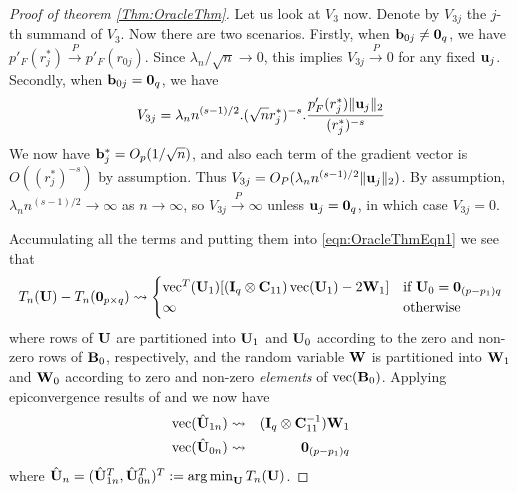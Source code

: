 \begin{proof}[Proof of theorem \ref{Thm:OracleThm}]
Let us look at $V_3$ now. Denote by $V_{3j}$ the $j$-th summand of $V_3$. Now there are two scenarios. Firstly, when ${\bf{b}}_{0j} \neq {\bf 0}_q$, we have $p'_F ( r_j^*) \stackrel{P}{\rightarrow} p'_F ( r_{0j})$. Since $\lambda_n / \sqrt n \rightarrow 0$, this implies $V_{3j} \stackrel{P}{\rightarrow} 0$ for any fixed ${\bf{u}}_j$. Secondly, when ${\bf{b}}_{0j} = {\bf 0}_q$, we have
%
$$
V_{3j} = \lambda_n n^{(s-1)/2}. (\sqrt n r^*_j )^{-s}.\frac{ p'_F ( r_j^*) \| {\bf{u}}_j \|_2 }{ (r^*_j) ^{-s}}
$$
%
We now have ${\bf{b}}^*_j = O_p(1/\sqrt n)$, and also each term of the gradient vector is $O ((r^*_j)^{-s})$ by assumption. Thus $V_{3j} = O_P( \lambda_n n^{(s-1)/2} \| {\bf{u}}_j \|_2)$. By assumption, $\lambda_n n^{(s-1)/2} \rightarrow \infty$ as $n \rightarrow \infty$, so $V_{3j} \stackrel{P}{\rightarrow} \infty$ unless ${\bf{u}}_j = {\bf 0}_q$, in which case $V_{3j} = 0$.

Accumulating all the terms and putting them into \ref{eqn:OracleThmEqn1} we see that
%
\begin{equation}
T_n({\mathbf{U}}) - T_n({\bf 0}_{p \times q}) \leadsto
\begin{cases}
\operatorname*{\text{vec}}^T ({\mathbf{U}}_1) [ ({\mathbf{I}}_q \otimes {\mathbf{C}}_{11}) \operatorname*{\text{vec}}({\mathbf{U}}_1) - 2 {\mathbf{W}}_1 ] & \text{if } {\mathbf{U}}_0 = {\bf 0}_{(p-p_1)q}\\
\infty & \text{otherwise}
\end{cases}
\end{equation}
where rows of ${\mathbf{U}}$ are partitioned into ${\mathbf{U}}_1$ and ${\mathbf{U}}_0$ according to the zero and non-zero rows of ${\mathbf{B}}_0$, respectively, and the random variable ${\mathbf{W}}$ is partitioned into ${\mathbf{W}}_1$ and ${\mathbf{W}}_0$ according to zero and non-zero \textit{elements} of $\operatorname*{\text{vec}} ({\mathbf{B}}_0)$. Applying epiconvergence results of \cite{Geyer94} and \cite{KnightFu00} we now have
%
\begin{eqnarray}
\operatorname*{\text{vec}}(\hat{{\mathbf{U}}}_{1n}) &\leadsto & ({\mathbf{I}}_q \otimes {\mathbf{C}}_{11}^{-1}) {\mathbf{W}}_1\label{eqn:OracleThmProofEqn2}\\
\operatorname*{\text{vec}}(\hat{{\mathbf{U}}}_{0n}) &\leadsto & {\bf 0}_{(p-p_1)q}\label{eqn:OracleThmProofEqn3}
\end{eqnarray}
%
where $\hat{{\mathbf{U}}}_n = (\hat{{\mathbf{U}}}_{1n}^T, \hat{{\mathbf{U}}}_{0n}^T)^T := \operatorname*{arg\,min}_{\mathbf{U}} T_n ({\mathbf{U}})$.


\end{proof}
